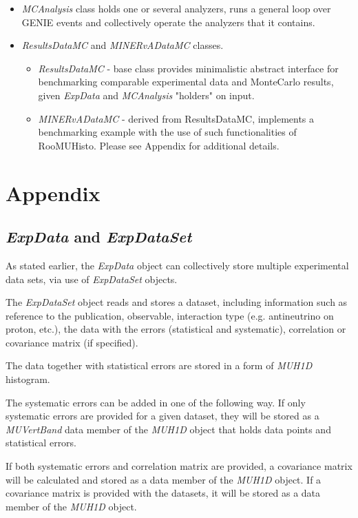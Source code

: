 \begin{itemize}
{}
\item{ {\it MCAnalysis} class holds one or several analyzers, runs a general loop over GENIE events and 
collectively operate the analyzers that it contains.}
\item{ {\it ResultsDataMC} and {\it MINERvADataMC} classes.
\begin{itemize}
\item{ {\it ResultsDataMC} - base class provides minimalistic abstract interface for benchmarking comparable
experimental data and MonteCarlo results, given {\it ExpData} and {\it MCAnalysis} "holders" on input. 
}
\item{ {\it MINERvADataMC} - derived from ResultsDataMC, implements a benchmarking example with the use of
such functionalities of RooMUHisto.
Please see Appendix for additional details.
}
\end{itemize}
}
\end{itemize}

\section{Appendix}

\subsection{ {\it ExpData} and {\it ExpDataSet} }

As stated earlier, the {\it ExpData} object can collectively store multiple experimental data sets,
via use of {\it ExpDataSet} objects.
 
The {\it ExpDataSet} object reads and stores a dataset, including information such 
as reference to the publication, observable, interaction type (e.g. antineutrino on proton, etc.), 
the data with the errors (statistical and systematic), correlation or covariance matrix (if specified). 

The data together with statistical errors are stored in a form of {\it MUH1D} histogram.

The systematic errors can be added in one of the following way. If only systematic errors are provided for 
a given dataset, they will be stored as a {\it MUVertBand} data member of the {\it MUH1D } object that holds 
data points and statistical errors. 

If both systematic errors and correlation matrix are provided, a covariance 
matrix will be calculated and stored as a data member of the {\it MUH1D } object. If a covariance matrix is 
provided with the datasets, it will be stored as a data member of the {\it MUH1D} object. \\


